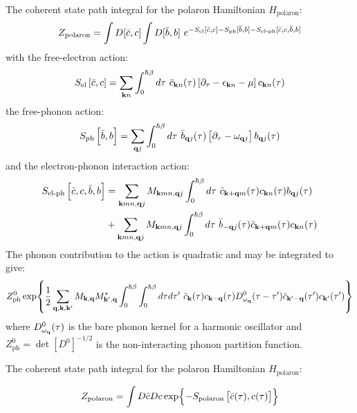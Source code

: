 The coherent state path integral for the polaron Hamiltonian $H_{\text{polaron}}$:
\begin{equation}
    Z_{\text{polaron}} = \int D[\Bar{c}, c] \int D[\Bar{b},b]\ e^{-S_{\text{el}}[\Bar{c}, c] - S_{\text{ph}}[\Bar{b},b] - S_{\text{el-ph}}[\Bar{c},c,\Bar{b},b]}
\end{equation}
with the free-electron action:
\begin{equation}
        S_{\text{el}}\left[\Bar{c}, c\right] =  \sum_{\vb{k}n} \int_0^{\hbar\beta} d\tau\ \Bar{c}_{\vb{k}n}(\tau) \left[\partial_{\tau} - \epsilon_{\vb{k}n} - \mu \right] c_{\vb{k}n}(\tau)
\end{equation}
the free-phonon action:
\begin{equation}
        S_{\text{ph}}\left[\Bar{b}, b\right] =  \sum_{\vb{q}j} \int_0^{\hbar\beta} d\tau\ \Bar{b}_{\vb{q}j}(\tau) \left[\partial_{\tau} - \omega_{\vb{q}j} \right] b_{\vb{q}j}(\tau)
\end{equation}
and the electron-phonon interaction action:
\begin{equation}
    \begin{aligned}
        S_{\text{el-ph}}\left[\Bar{c}, c, \Bar{b}, b\right] &=  \sum_{\vb{k}mn,\vb{q}j} M_{\vb{k}mn, \vb{q}j} \int_0^{\hbar\beta} d\tau\ \Bar{c}_{\vb{k}+\vb{q}m}(\tau) c_{\vb{k}n}(\tau) b_{\vb{q}j}(\tau) \\
        &+ \sum_{\vb{k}mn,\vb{q}j} M_{\vb{k}mn, \vb{q}j} \int_0^{\hbar\beta} d\tau\ \Bar{b}_{-\vb{q}j}(\tau) \Bar{c}_{\vb{k}+\vb{q}m}(\tau) c_{\vb{k}n}(\tau)
    \end{aligned}
\end{equation}
The phonon contribution to the action is quadratic and may be integrated to give:
\begin{equation}
    Z^0_{\text{ph}} \exp{\frac{1}{2} \sum_{\vb{q}, \vb{k}, \vb{k}'} M_{\vb{k}, \vb{q}} M^*_{\vb{k}', \vb{q}} \int_0^{\hbar\beta} \int_0^{\hbar\beta} d\tau d\tau'\ \Bar{c}_{\vb{k}}(\tau) c_{\vb{k} - \vb{q}} (\tau) D^0_{\omega_{\vb{q}}}(\tau - \tau') \Bar{c}_{\vb{k}'-\vb{q}}(\tau') c_{\vb{k}'}(\tau')}
\end{equation}
where $D^0_{\omega_{\vb{q}}}(\tau)$ is the bare phonon kernel for a harmonic oscillator and $Z^0_{\text{ph}} = \det
\left[D^0\right]^{-1/2}$ is the non-interacting phonon partition function.

The coherent state path integral for the polaron Hamiltonian $H_{\text{polaron}}$:

\begin{equation}
    Z_{\text{polaron}} = \int D\Bar{c} Dc \exp{-S_{\text{polaron}}\left[\Bar{c}(\tau), c(\tau)\right]}
\end{equation}

